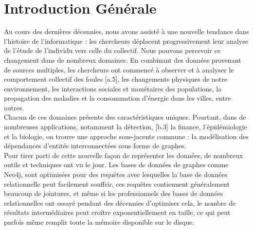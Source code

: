 \chapter*{Introduction Générale}
Au cours des dernières décennies, nous avons assisté à une nouvelle tendance dans l'histoire de l'informatique : les chercheurs déplacent progressivement leur analyse de l'étude de l'individu vers celle du collectif. Nous pouvons percevoir ce changement dans de nombreux domaines. En combinant des données provenant de sources multiples, les chercheurs ont commencé à observer et à analyser le comportement collectif des foules [a.5], les changements physiques de notre environnement, les interactions sociales et monétaires des populations, la propagation des maladies et la consommation d'énergie dans les villes, entre autres.\\

Chacun de ces domaines présente des caractéristiques uniques. Pourtant, dans de nombreuses applications, notamment la détection, [b.3] la finance, l'épidémiologie et la biologie, on trouve une approche sous-jacente commune : la modélisation des dépendances d'entités interconnectées sous forme de graphes.\\

Pour tirer parti de cette nouvelle façon de représenter les données, de nombreux outils et techniques ont vu le jour. Les bases de données de graphes comme Neo4j, sont optimisées pour des requêtes avec lesquelles la base de données relationnelle peut facilement souffrir, ces requêtes contiennent généralement beaucoup de jointures, et même si les professionnels des bases de données relationnelles ont essayé pendant des décennies d'optimiser cela, le nombre de résultats intermédiaires peut croître exponentiellement en taille, ce qui peut parfois même remplir toute la mémoire disponible sur le disque.\\

